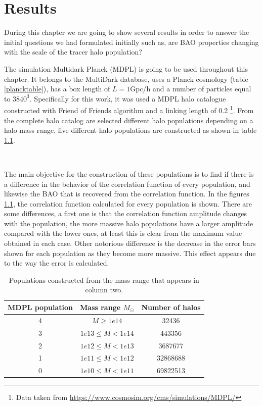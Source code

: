 \chapter{ Results }


During this chapter we are going to show several results in order to answer the 
initial questions we had formulated initially such as, are BAO properties changing with the 
scale of the tracer halo population? 

The simulation Multidark Planck (MDPL) is going to be used throughout this chapter. It
belongs to the MultiDark database, uses a Planck cosmology (table \ref{plancktable}), has 
a box length of $L=1$Gpc/h and a number of particles equal to $3840^3$.
Specifically for this work, it was used a MDPL halo catalogue constructed with Friend of 
Friends algorithm and a linking length of 0.2 \footnote{ Data taken from \url{https://www.cosmosim.org/cms/simulations/MDPL/}}. From the complete halo catalog are selected different halo populations
depending on a halo mass range, five different halo populations are constructed as shown in table \ref{pophalos}.

\

The main objective for the construction of these populations is to find if there is 
a difference in the behavior of the correlation function of every population, 
and likewise the BAO that is recovered from the correlation function. 
In the figures \ref{pophalos}, the correlation function calculated for every population 
is shown. There are some differences, a first one is that the correlation function amplitude 
changes with the population, the more massive halo populations have a larger amplitude
compared with the lower ones, at least this is clear from the maximum value obtained in
each case. Other notorious difference is the decrease in the error bars shown for each
population as they become more massive. This effect appears due to the way the error is
calculated. 


\begin{table}
\begin{center}
  \begin{tabular}{ | c | c | c | }
    \hline \hline
    MDPL population & Mass range $M_{\odot}$& Number of halos \\ \hline \hline
    4 & $ M \geqslant 1e14$ & 32436 \\ \hline
    3 & $ 1e13 \leq M < 1e14 $ & 443356\\ \hline
    2 & $ 1e12 \leq M < 1e13$ & 3687677\\ \hline
    1 & $ 1e11 \leq M < 1e12$ & 32868688 \\ \hline
    0 & $ 1e10 \leq M < 1e11$ &  69822513 \\ \hline
  \end{tabular}  
   \caption{ Populations constructed from the mass range that appears in column two. }
\label{pophalos}
\end{center}
\end{table}

